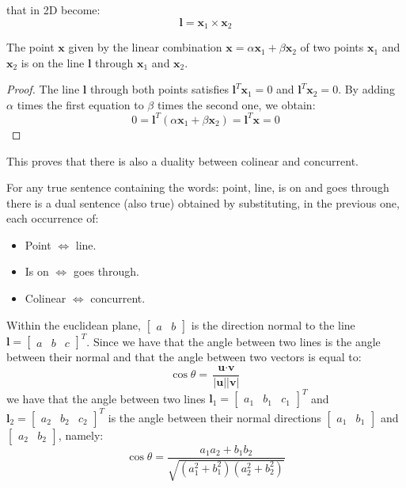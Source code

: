\documentclass[12pt, a4paper]{report}
\newtheorem[style=M,bodystyle=\normalfont]{theorem}{Theorem}
\newtheorem[style=M,bodystyle=\normalfont]{corollary}{Corollary}
\newtheorem[style=M,bodystyle=\normalfont]{lemma}{Lemma}
\newtheorem[style=M,bodystyle=\normalfont]{definition}{Definition}
\begin{document}
    that in 2D become: 
    \[\textbf{l}=\textbf{x}_1 \times \textbf {x}_2\] 
    \begin{example}[Property]
        The point $\textbf{x}$ given by the linear combination $\textbf{x}=\alpha\textbf{x}_1+\beta\textbf{x}_2$ of two points $\textbf{x}_1$ and $\textbf{x}_2$ is on the 
        line $\textbf{l}$ through $\textbf{x}_1$ and $\textbf{x}_2$. 
    \end{example}
    \begin{proof}
        The line $\textbf{l}$ through both points satisfies $\textbf{l}^T\textbf{x}_1=0$ and  $\textbf{l}^T\textbf{x}_2=0$. By adding $\alpha$ times the first 
        equation to $\beta$ times the second one, we obtain: 
        \[0=\textbf{l}^T\left( \alpha\textbf{x}_1+\beta\textbf{x}_2 \right)=\textbf{l}^T\textbf{x}=0\]
    \end{proof}
    This proves that there is also a duality between colinear and concurrent. 
    \begin{theorem}
        For any true sentence containing the words: point, line, is on and goes through there is a dual sentence (also true) obtained by substituting, in the previous one, each 
        occurrence of: 
        \begin{itemize}
            \item Point $\Leftrightarrow$ line. 
            \item Is on $\Leftrightarrow$ goes through.
            \item Colinear $\Leftrightarrow$ concurrent. 
        \end{itemize}
    \end{theorem}
    Within the euclidean plane, $\begin{bmatrix} a & b \end{bmatrix}$ is the direction normal to the line $\textbf{l}={\begin{bmatrix} a & b & c \end{bmatrix}}^T$. Since we have that
    the angle between two lines is the angle between their normal and that the angle between two vectors is equal to:
    \[\cos\theta=\dfrac{\textbf{u} \cdot \textbf{v}}{\left\lvert \textbf{u} \right\rvert \left\lvert \textbf{v} \right\rvert}\] 
    we have that the angle between two lines $\textbf{l}_1={\begin{bmatrix} a_1 & b_1 & c_1 \end{bmatrix}}^T$ and $\textbf{l}_2={\begin{bmatrix} a_2 & b_2 & c_2 \end{bmatrix}}^T$ 
    is the angle between their normal directions $\begin{bmatrix} a_1 & b_1 \end{bmatrix}$ and $\begin{bmatrix} a_2 & b_2 \end{bmatrix}$, namely: 
    \[\cos\theta=\dfrac{a_1a_2+b_1b_2}{\sqrt{\left( a_1^2 + b_1^2 \right)\left( a_2^2 + b_2^2 \right)}}\]
    
\end{document}

